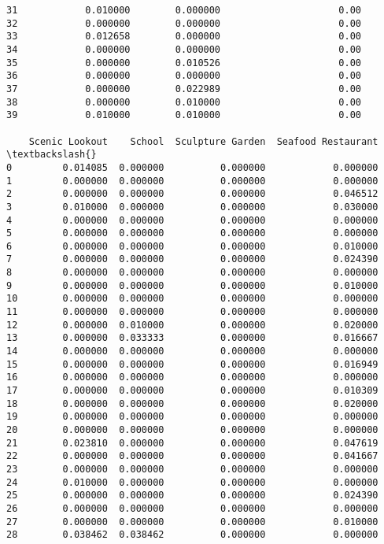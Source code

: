\documentclass[11pt]{article}
\begin{document}
\begin{tcolorbox}[breakable, size=fbox, boxrule=.5pt, pad at break*=1mm, opacityfill=0]
\begin{Verbatim}[commandchars=\\\{\}]
31            0.010000        0.000000                     0.00
32            0.000000        0.000000                     0.00
33            0.012658        0.000000                     0.00
34            0.000000        0.000000                     0.00
35            0.000000        0.010526                     0.00
36            0.000000        0.000000                     0.00
37            0.000000        0.022989                     0.00
38            0.000000        0.010000                     0.00
39            0.010000        0.010000                     0.00

    Scenic Lookout    School  Sculpture Garden  Seafood Restaurant  \textbackslash{}
0         0.014085  0.000000          0.000000            0.000000
1         0.000000  0.000000          0.000000            0.000000
2         0.000000  0.000000          0.000000            0.046512
3         0.010000  0.000000          0.000000            0.030000
4         0.000000  0.000000          0.000000            0.000000
5         0.000000  0.000000          0.000000            0.000000
6         0.000000  0.000000          0.000000            0.010000
7         0.000000  0.000000          0.000000            0.024390
8         0.000000  0.000000          0.000000            0.000000
9         0.000000  0.000000          0.000000            0.010000
10        0.000000  0.000000          0.000000            0.000000
11        0.000000  0.000000          0.000000            0.000000
12        0.000000  0.010000          0.000000            0.020000
13        0.000000  0.033333          0.000000            0.016667
14        0.000000  0.000000          0.000000            0.000000
15        0.000000  0.000000          0.000000            0.016949
16        0.000000  0.000000          0.000000            0.000000
17        0.000000  0.000000          0.000000            0.010309
18        0.000000  0.000000          0.000000            0.020000
19        0.000000  0.000000          0.000000            0.000000
20        0.000000  0.000000          0.000000            0.000000
21        0.023810  0.000000          0.000000            0.047619
22        0.000000  0.000000          0.000000            0.041667
23        0.000000  0.000000          0.000000            0.000000
24        0.010000  0.000000          0.000000            0.000000
25        0.000000  0.000000          0.000000            0.024390
26        0.000000  0.000000          0.000000            0.000000
27        0.000000  0.000000          0.000000            0.010000
28        0.038462  0.038462          0.000000            0.000000

\end{Verbatim}
\end{tcolorbox}
\end{document}
